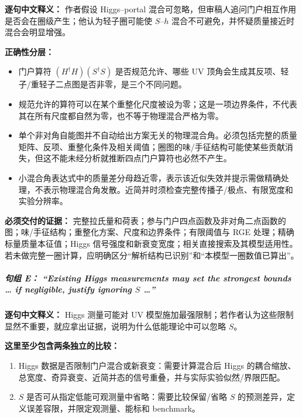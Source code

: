 \documentclass[
  chinese,
  UTF8]{ctexart}
\providecommand{\tightlist}{%
  \setlength{\itemsep}{0pt}\setlength{\parskip}{0pt}}
\begin{document}
\textbf{逐句中文释义：} 作者假设 Higgs--portal
混合可忽略，但审稿人追问门户相互作用是否会在圈级产生；他认为轻子圈可能使
\(S\)--\(h\) 混合不可避免，并怀疑质量接近时混合会明显增强。

\textbf{正确性分层：}

\begin{itemize}
\tightlist
\item
  门户算符 \((H^\dagger H)(S^\dagger S)\) 是否规范允许、哪些 UV
  顶角会生成其反项、轻子/重轻子二点图是否非零，是三个不同问题。
\item
  规范允许的算符可以在某个重整化尺度被设为零；这是一项边界条件，不代表其在所有尺度都自然为零，也不等于物理混合严格为零。
\item
  单个非对角自能图并不自动给出方案无关的物理混合角。必须包括完整的质量矩阵、反项、重整化条件及相关阈值；圈图的味/手征结构可能使某些贡献消失，但这不能未经分析就推断四点门户算符也必然不产生。
\item
  小混合角表达式中的质量差分母趋近零，表示该近似失效并提示需做精确处理，不表示物理混合角发散。近简并时须检查完整传播子/极点、有限宽度和实验分辨率。
\end{itemize}

\textbf{必须交付的证据：}
完整拉氏量和荷表；参与门户四点函数及非对角二点函数的图；味/手征结构；重整化方案、尺度和边界条件；有限阈值与
RGE 处理；精确标量质量本征值；Higgs
信号强度和新衰变宽度；相关直接搜索及其模型适用性。若未做完整一圈计算，应明确区分``解析结构已识别''和``本模型一圈数值已算出''。

\subparagraph{\texorpdfstring{句组 E： ``Existing Higgs measurements may
set the strongest bounds \ldots{} if negligible, justify ignoring \(S\)
\ldots''}{句组 E： ``Existing Higgs measurements may set the strongest bounds \ldots{} if negligible, justify ignoring S \ldots''}}\label{ux53e5ux7ec4-e-existing-higgs-measurements-may-set-the-strongest-bounds-if-negligible-justify-ignoring-s}

\textbf{逐句中文释义：} Higgs 测量可能对 UV
模型施加最强限制；若作者认为这些限制显然不重要，就应拿出证据，说明为什么低能理论中可以忽略
\(S\)。

\textbf{这里至少包含两条独立的比较：}

\begin{enumerate}
\def\labelenumi{\arabic{enumi}.}
\tightlist
\item
  Higgs 数据是否限制门户混合或新衰变：需要计算混合后 Higgs
  的耦合缩放、总宽度、奇异衰变、近简并态的信号重叠，并与实际实验似然/界限匹配。
\item
  \(S\) 是否可从指定低能可观测量中省略：需要比较保留/省略 \(S\)
  的预测差异，定义误差容限，并限定观测量、能标和 benchmark。
\end{enumerate}
\end{document}
